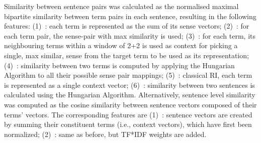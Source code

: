 Similarity between sentence pairs was calculated as the normalised maximal bipartite similarity between term pairs in each sentence, resulting in the following features: 
(1)~: each term is represented as the sum of its sense vectors;
(2)~: for each term pair, the sense-pair with max similarity is used;
(3)~: for each term, its neighbouring terms within a window of 2+2 is used as context for picking a single, max similar, sense from the target term to be used as its representation;
(4)~: similarity between two terms is computed by applying the Hungarian Algorithm to all their possible sense pair mappings;
(5)~: classical RI, each term is represented as a single context vector;
(6)~: similarity between two sentences is calculated using the Hungarian Algorithm.
Alternatively, sentence level similarity was computed as the cosine similarity between sentence vectors composed of their terms' vectors. The corresponding features are 
(1)~: sentence vectors are created by summing their constituent terms 
(i.e., context vectors), which have first been normalized; 
(2)~: same as before, but TF*IDF weights are added.

